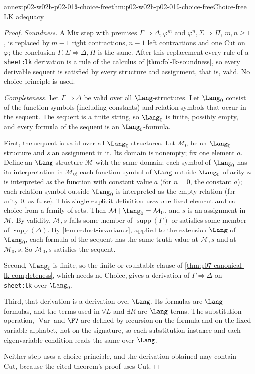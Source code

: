 \begin{annexitem}{annex:p02-w02b-p02-019-choice-free}{thm:p02-w02b-p02-019-choice-free}{Choice-free LK adequacy}
\begin{proof}
\emph{Soundness.}  A Mix step with premises
\(\Gamma\Rightarrow\Delta,\varphi^{m}\) and
\(\varphi^{n},\Sigma\Rightarrow\Pi\), \(m,n\ge 1\), is replaced by \(m-1\)
right contractions, \(n-1\) left contractions and one Cut on \(\varphi\);
the conclusion \(\Gamma,\Sigma\Rightarrow\Delta,\Pi\) is the same.  After
this replacement every rule of a \texttt{sheet:lk} derivation is a rule of
the calculus of \cref{thm:fol-lk-soundness}, so every derivable sequent is
satisfied by every structure and assignment, that is, valid.  No choice
principle is used.

\emph{Completeness.}  Let \(\Gamma\Rightarrow\Delta\) be valid over all
\(\Lang\)-structures.  Let \(\Lang_0\) consist of the function symbols
(including constants) and relation symbols that occur in the sequent.  The
sequent is a finite string, so \(\Lang_0\) is finite, possibly empty, and
every formula of the sequent is an \(\Lang_0\)-formula.

First, the sequent is valid over all \(\Lang_0\)-structures.  Let
\(\mathcal M_0\) be an \(\Lang_0\)-structure and \(s\) an assignment in it.  Its
domain is nonempty; fix one element \(a\).  Define an \(\Lang\)-structure
\(\mathcal M\) with the same domain: each symbol of \(\Lang_0\) has its
interpretation in \(\mathcal M_0\); each function symbol of \(\Lang\) outside
\(\Lang_0\) of arity \(n\) is interpreted as the function with constant value
\(a\) (for \(n=0\), the constant \(a\)); each relation symbol outside
\(\Lang_0\) is interpreted as the empty relation (for arity \(0\), as false).
This single explicit definition uses one fixed element and no choice from a
family of sets.  Then \(\mathcal M\mathbin{\upharpoonright}\Lang_0=\mathcal M_0\), and \(s\) is an
assignment in \(\mathcal M\).  By validity, \(\mathcal M,s\) fails some member of
\(\operatorname{supp}(\Gamma)\) or satisfies some member of
\(\operatorname{supp}(\Delta)\).  By \cref{lem:reduct-invariance}, applied to
the extension \(\Lang\) of \(\Lang_0\), each formula of the sequent has the
same truth value at \(\mathcal M,s\) and at \(\mathcal M_0,s\).  So \(\mathcal M_0,s\)
satisfies the sequent.

Second, \(\Lang_0\) is finite, so the finite-or-countable clause of
\cref{thm:p07-canonical-lk-completeness}, which needs no Choice, gives a
derivation of \(\Gamma\Rightarrow\Delta\) on \texttt{sheet:lk} over
\(\Lang_0\).

Third, that derivation is a derivation over \(\Lang\).  Its formulas are
\(\Lang\)-formulas, and the terms used in \(\forall L\) and \(\exists R\) are
\(\Lang\)-terms.  The substitution operation, \(\operatorname{Var}\) and
\(\FV\) are defined by recursion on the formula and on the fixed variable
alphabet, not on the signature, so each substitution instance and each
eigenvariable condition reads the same over \(\Lang\).

Neither step uses a choice principle, and the derivation obtained may
contain Cut, because the cited theorem's proof uses Cut.
\end{proof}
\end{annexitem}
